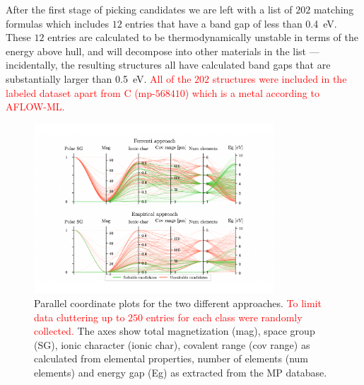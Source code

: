 \documentclass[superscriptaddress,unsortedaddress,
 amsmath,amssymb,
 aps,
]{revtex4-2}
\newcommand{\mrk}[1]{\textcolor{red}{#1}}
\begin{document}
After the first stage of picking candidates we are left with a list of $202$ matching formulas which includes $12$ entries that have a band gap of less than \SI{0.4}{\electronvolt}.
These $12$ entries are calculated to be thermodynamically unstable in terms of the energy above hull, and will decompose into other materials in the list --- incidentally, the resulting structures all have calculated band gaps that are substantially larger than \SI{0.5}{\electronvolt}.
\mrk{All of the $202$ structures were included in the labeled dataset apart from C (mp-$568410$) which is a metal according to AFLOW-ML. }
 
\begin{figure}[t] %
    \centering
    \includegraphics[width=0.8\textwidth]{figure3.pdf}
    \caption{Parallel coordinate plots for the two different approaches. \mrk{To limit data cluttering up to $250$ entries for each class were randomly collected.}  
    The axes show total magnetization (mag), space group (SG), ionic character (ionic char), covalent range (cov range) as calculated from elemental properties, number of elements (num elements) and energy gap (Eg) as extracted from the MP database.} 
    \label{fig:parallel-coordinates-approaches}
\end{figure}
\end{document}
